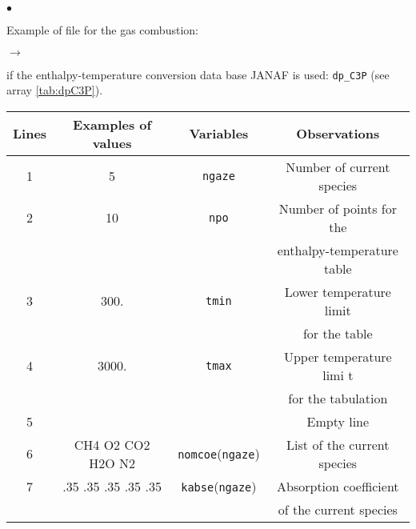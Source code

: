{{{\begin{list}{$\bullet$}{}
       \item Example of file for the gas combustion:
        \begin{list}{$\rightarrow$}{}
               \item if the enthalpy-temperature conversion data base
                     JANAF is used: \texttt{dp\_C3P} (see
                     array \ref{tab:dpC3P}).

\begin{table}[htbp]
\begin{center}
\small{
\begin{tabular}{|c|c|c|c|} \hline
 Lines  &Examples of values &        Variables             & Observations                                     \\ \hline
  1     &         5         &  \texttt{ngaze\index{ngaze}} & Number of current species                        \\ \hline
  2     &        10         &   \texttt{npo\index{npo}}    & Number of points for the                         \\
        &                   &                              & enthalpy-temperature table                       \\ \hline
  3     &       300.        &  \texttt{tmin\index{tmin}}   & Lower temperature limit                          \\
        &                   &                              & for the table                                    \\ \hline
  4     &      3000.        &  \texttt{tmax\index{tmax}}   & Upper temperature limi   t                       \\
        &                   &                              & for the tabulation                               \\ \hline
  5     &                   &                              & Empty line                                       \\ \hline
  6     & CH4 O2 CO2 H2O N2 &  \texttt{nomcoe\index{nomcoe}}(\texttt{ngaze}) & List of the current species                      \\ \hline
  7     &.35 .35 .35 .35 .35&  \texttt{kabse\index{kabse}}(\texttt{ngaze})   & Absorption coefficient                           \\
        &                   &                              & of  the current species                          \\ \hline

\end{tabular}}
\end{center}
\end{table}
\end{list}
\end{list}}}}
